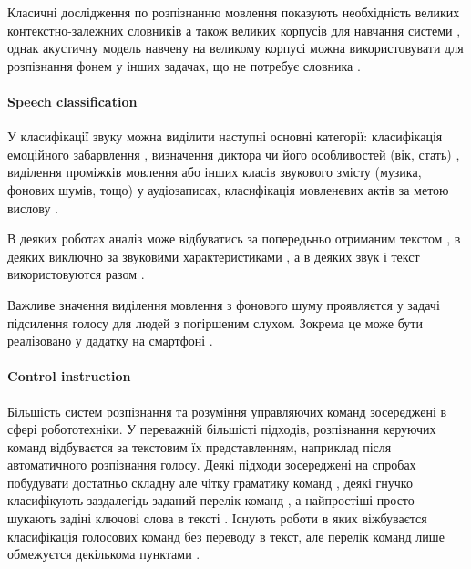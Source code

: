 Класичні дослідження по розпізнанню мовлення показують необхідність великих контекстно-залежних словників а також великих корпусів для навчання системи \cite{Pylypenko_2008,Pylypenko_2009,Pylypenko_2010,Lydovyk_2011,Vasilyeva_2012,Womack_1999,Zirneeva_2008,Gladunov_2005}, однак акустичну модель навчену на великому корпусі можна використовувати для розпізнання фонем у інших задачах, що не потребує словника \cite{Pylypenko_2008,Robeyko_2012,Abdel_2012,Zhang_2017,Sharma_2018,Yermolenko_2008}. 

\paragraph{Speech classification}

У класифікації звуку можна виділити наступні основні категорії: класифікація емоційного забарвлення \cite{Ververidis_2004,Ververidis_2004_2,Ververidis_2006,Kaya_2017,Deb_2016,Bhaskar_2015,Devillers_2015,Weisskirchen_2017,Sharma_2018,Ozseven_2018}, визначення диктора \cite{Rabotyagov_2006} чи його особливостей (вік, стать) \cite{Kaya_2017}, виділення проміжків мовлення \cite{Hussain_2018,Khonglah_2016,Benatan_2015,Priya_2012} або інших класів звукового змісту (музика, фонових шумів, тощо) \cite{Hussain_2018,Boddapati_2017} у аудіозаписах, класифікація мовленевих актів за метою вислову \cite{Ko_2015,Choi_1999,Grosz_1995,En_2005,Kang_2013,Kim_2012,Lee_2002,Sridhar_2008,Webb_2005,Kang_2010,Hellbernd_2016,Su_2017}.

В деяких роботах аналіз може відбуватись за попередьньо отриманим текстом \cite{Ko_2015,Choi_1999,Grosz_1995,En_2005,Kang_2013,Kim_2012,Lee_2002,Webb_2005,Kang_2010}, в деяких виключно за звуковими характеристиками \cite{Ververidis_2004,Ververidis_2004_2,Ververidis_2006,Kaya_2017,Deb_2016,Devillers_2015,Weisskirchen_2017,Sharma_2018,Hussain_2018,Khonglah_2016,Benatan_2015,Priya_2012,Boddapati_2017,Hellbernd_2016}, а в деяких звук і текст використовуются разом \cite{Bhaskar_2015,Sridhar_2008,Chowdhury_2018}.

Важливе значення виділення мовлення з фонового шуму проявляєтся у задачі підсилення голосу для людей з погіршеним слухом. Зокрема це може бути реалізовано у дадатку на смартфоні \cite{Vashkevich_2018}.

\paragraph{Control instruction}

Більшість систем розпізнання та розуміння управляючих команд зосереджені в сфері робототехніки. У переважній більшісті підходів, розпізнання керуючих команд відбуваєтся за текстовим їх представленням, наприклад після автоматичного розпізнання голосу. Деякі підходи зосереджені на спробах побудувати достатньо складну але чітку граматику команд \cite{Misra_2016,Fasola_2013,Eppe_2016}, деякі гнучко класифікують заздалегідь заданий перелік команд \cite{Yongda_2018}, а найпростіші просто шукають задіні ключові слова в тексті \cite{Shwe_2003,Shulika_2018}. Існують роботи в яких віжбуваєтся класифікація голосових команд без переводу в текст, але перелік команд лише обмежуєтся декількома пунктами \cite{Shulika_2018,Gryshchuk_2006}.

